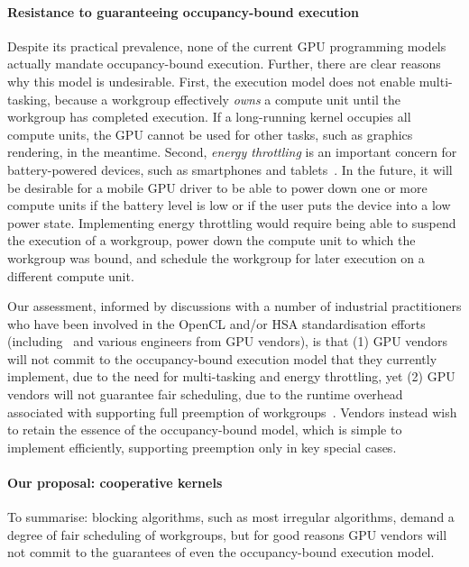 \documentclass[numbers,nocopyrightspace,10pt]{sigplanconf}
\begin{document}
\paragraph{Resistance to guaranteeing occupancy-bound execution}

Despite its practical prevalence, none of the current GPU programming
models actually mandate occupancy-bound execution.  Further, there are
clear reasons why this model is undesirable.
First, the execution model does not enable
multi-tasking, because a workgroup effectively \emph{owns} a compute
unit until the workgroup has completed execution.  If a long-running
kernel occupies all compute units, the GPU cannot be used for other
tasks, such as graphics rendering, in the meantime.
Second, \emph{energy throttling} is
an important concern for battery-powered devices, such as smartphones
and tablets~\cite{DBLP:journals/comsur/Vallina-RodriguezC13}.  In the future, it will be desirable for a mobile GPU driver to be able to
power down one or more compute units if the battery level is low or if
the user puts the device into a low power state.  Implementing energy
throttling would require being able to suspend the execution of a
workgroup, power down the compute unit to which the workgroup was
bound, and schedule the workgroup for later execution on a different
compute unit.

Our assessment, informed by discussions with a number of industrial
practitioners who have been involved in the OpenCL and/or HSA
standardisation efforts
(including~\cite{PersonalCommunicationRichards,PersonalCommunicationHowes}
and various engineers from GPU vendors), is that (1) GPU vendors will
not commit to the occupancy-bound execution model that they currently
implement, due to the need for multi-tasking and energy throttling,
yet (2) GPU vendors will not guarantee fair scheduling, due to the
runtime overhead associated with supporting full preemption of
workgroups~\cite{ISCAPAPERSreeMentioned}.  Vendors instead wish to
retain the essence of the occupancy-bound model, which is
simple to implement efficiently, supporting preemption
only in key special cases.


\paragraph{Our proposal: cooperative kernels}
%
To summarise: blocking algorithms, such as most irregular algorithms,
demand a degree of fair scheduling of workgroups, but for good reasons
GPU vendors will not commit to the guarantees of even the
occupancy-bound execution model.
\end{document}
